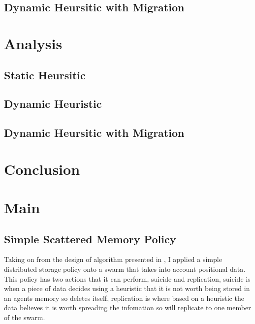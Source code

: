 \documentclass{UoYCSproject}
\begin{document}
\section{Dynamic Heursitic with Migration}
\label{sec:Simple4}



\chapter{Analysis}
\label{cha:Analysis}


\section{Static Heursitic}
\label{sec:Simple2a}


\section{Dynamic Heuristic}
\label{sec:Simple3a}


\section{Dynamic Heursitic with Migration}
\label{sec:Simple4a}



\chapter{Conclusion}
\label{cha:conclusion}






\chapter{Main}
\label{cha:Main}



\section{Simple Scattered Memory Policy}
\label{sec:Simple1}

Taking on from the design of algorithm presented in \cite{Distributed Storage}, I applied a simple distributed storage policy onto a swarm that takes into account positional data.
This policy has two actions that it can perform, suicide and replication, suicide is when a piece of data decides using a heuristic that it is not worth being stored in an agents memory so deletes itself, replication is where based on a heuristic the data believes it is worth spreading the infomation so will replicate to one member of the swarm.
\end{document}
